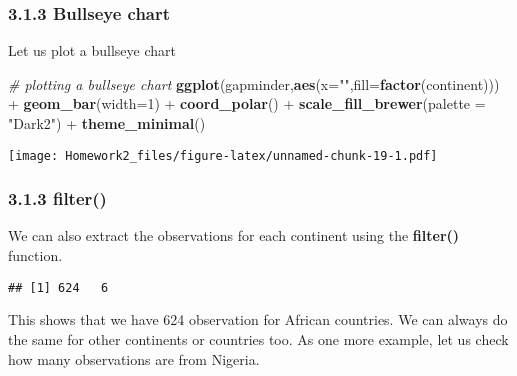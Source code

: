 \documentclass[]{article}
\newenvironment{Shaded}{\begin{snugshade}}{\end{snugshade}}
\newcommand{\KeywordTok}[1]{\textcolor[rgb]{0.13,0.29,0.53}{\textbf{{#1}}}}
\newcommand{\DataTypeTok}[1]{\textcolor[rgb]{0.13,0.29,0.53}{{#1}}}
\newcommand{\DecValTok}[1]{\textcolor[rgb]{0.00,0.00,0.81}{{#1}}}
\newcommand{\StringTok}[1]{\textcolor[rgb]{0.31,0.60,0.02}{{#1}}}
\newcommand{\CommentTok}[1]{\textcolor[rgb]{0.56,0.35,0.01}{\textit{{#1}}}}
\newcommand{\NormalTok}[1]{{#1}}
\begin{document}
\subsubsection{\texorpdfstring{3.1.3 \textbf{Bullseye
chart}}{3.1.3 Bullseye chart}}\label{bullseye-chart}

Let us plot a bullseye chart

\begin{Shaded}
\begin{Highlighting}[]
\CommentTok{# plotting a bullseye chart}
\KeywordTok{ggplot}\NormalTok{(gapminder,}\KeywordTok{aes}\NormalTok{(}\DataTypeTok{x=}\StringTok{""}\NormalTok{,}\DataTypeTok{fill=}\KeywordTok{factor}\NormalTok{(continent))) +}\StringTok{ }\KeywordTok{geom_bar}\NormalTok{(}\DataTypeTok{width=}\DecValTok{1}\NormalTok{) +}
\StringTok{  }\KeywordTok{coord_polar}\NormalTok{()  +}
\StringTok{    }\KeywordTok{scale_fill_brewer}\NormalTok{(}\DataTypeTok{palette =} \StringTok{"Dark2"}\NormalTok{)  +}
\StringTok{      }\KeywordTok{theme_minimal}\NormalTok{()  }
\end{Highlighting}
\end{Shaded}

\texttt{[image: Homework2\_files/figure-latex/unnamed-chunk-19-1.pdf]}

\subsubsection{\texorpdfstring{3.1.3
\textbf{filter()}}{3.1.3 filter()}}\label{filter}

We can also extract the observations for each continent using the
\textbf{filter()} function.

\begin{Shaded}
\end{Shaded}

\begin{verbatim}
## [1] 624   6
\end{verbatim}

This shows that we have 624 observation for African countries. We can
always do the same for other continents or countries too. As one more
example, let us check how many observations are from Nigeria.
\end{document}
